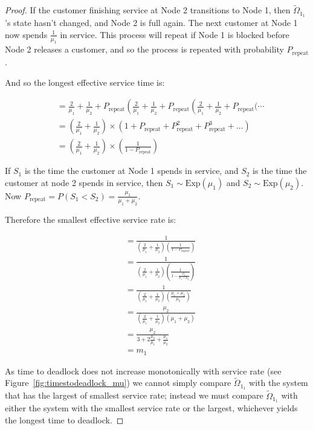 \documentclass{article}
\begin{document}
\begin{proof}
If the customer finishing service at Node 2 transitions to Node 1, then $\widetilde{\Omega}_{1_1}$'s state hasn't changed, and Node 2 is full again.
The next customer at Node 1 now spends $\frac{1}{\mu_1}$ in service.
This process will repeat if Node 1 is blocked before Node 2 releases a customer, and so the process is repeated with probability $P_{\text{repeat}}$.

And so the longest effective service time is:

\begin{align*}
  & = \frac{2}{\mu_1} + \frac{1}{\mu_2} + P_{\text{repeat}} \left( \frac{2}{\mu_1} + \frac{1}{\mu_2} + P_{\text{repeat}} \left( \frac{2}{\mu_1} + \frac{1}{\mu_2} + P_{\text{repeat}} \bigg( \dotsi \right. \right. \\
  & = \left( \frac{2}{\mu_1} + \frac{1}{\mu_2} \right) \times \left( 1 + P_{\text{repeat}} + P_{\text{repeat}}^2 + P_{\text{repeat}}^3 + \dots \right) \\
  & = \left( \frac{2}{\mu_1} + \frac{1}{\mu_2} \right) \times \left( \frac{1}{1 - P_{\text{repeat}}} \right)
\end{align*}

If $S_1$ is the time the customer at Node 1 spends in service, and $S_2$ is the time the customer at node 2 spends in service, then $S_1 \sim \text{Exp}(\mu_1)$ and $S_2 \sim \text{Exp}(\mu_2)$.
Now $P_{\text{repeat}} = P(S_1 < S_2) = \frac{\mu_1}{\mu_1 + \mu_2}$.

Therefore the smallest effective service rate is:

\begin{align*}
  & = \frac{1}{ \left( \frac{2}{\mu_1} + \frac{1}{\mu_2} \right) \left( \frac{1}{1-P_{\text{repeat}}} \right) } \\
  & = \frac{1}{ \left( \frac{2}{\mu_1} + \frac{1}{\mu_2} \right) \left( \frac{1}{1-\frac{\mu_1}{\mu_1 + \mu_2}} \right) } \\
  & = \frac{1}{ \left( \frac{2}{\mu_1} + \frac{1}{\mu_2} \right) \left( \frac{\mu_1 + \mu_2}{\mu_2} \right) } \\
  & = \frac{\mu_2}{ \left( \frac{2}{\mu_1} + \frac{1}{\mu_2} \right) \left( \mu_1 + \mu_2 \right) } \\
  & = \frac{\mu_2}{3 + 2\frac{\mu_2}{\mu_1} + \frac{\mu_1}{\mu_2}} \\
  & = m_1
\end{align*}

As time to deadlock does not increase monotonically with service rate (see Figure~\ref{fig:timestodeadlock_mu}) we cannot simply compare $\widetilde{\Omega}_{1_1}$ with the system that has the largest of smallest service rate; instead we must compare $\widetilde{\Omega}_{1_1}$ with either the system with the smallest service rate or the largest, whichever yields the longest time to deadlock.


\end{proof}
\end{document}
